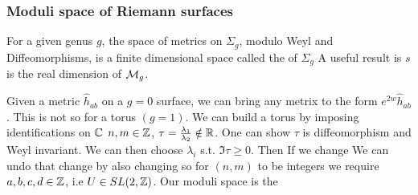 \documentclass{article}
\begin{document}
\subsubsection*{Moduli space of Riemann surfaces}
For a given genus $g$,  the space of metrics on $\Sigma_g$, modulo Weyl and Diffeomorphisms, is a finite dimensional space called the  of $\Sigma_g$
A useful result is 
$s$ is the real dimension of $\mathcal{M}_g$. 

\begin{example}[Torus]
Given a metric $\hat{h}_{ab}$ on a $g=0$ surface, we can bring any metrix to the form $e^{2w}\hat{h}_{ab}$. This is not so for a torus $(g=1)$. We can build a torus by imposing identifications on $\mathbb{C}$
$n,m \in \mathbb{Z}$, $\tau = \frac{\lambda_1}{\lambda_2}\notin \mathbb{R}$. One can show $\tau$ is diffeomorphism and Weyl invariant. We can then choose $\lambda_i$ s.t. $\Im \tau \geq 0$. Then 
If we change 
We can undo that change by also changing 
so for $(n,m)$ to be integers we require $a,b,c,d \in \mathbb{Z}$, i.e $U\in SL(2,\mathbb{Z})$. Our moduli space is the 
\end{example}
\end{document}
